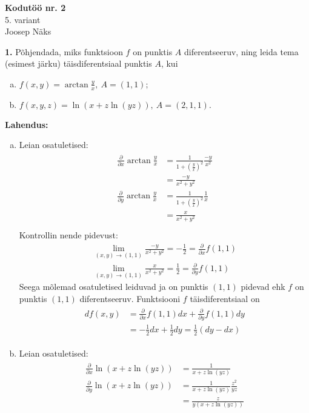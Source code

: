 \documentclass{article}
\newcommand{\p}[1]{\frac{\partial}{\partial #1}}
\begin{document}
\begin{center}
\Large\textbf{Kodutöö nr. 2}\\
5. variant\\
\small{Joosep Näks}
\end{center}
\textbf{1. } Põhjendada, miks funktsioon $f$ on punktis $A$ diferentseeruv, ning leida tema (esimest järku) täisdiferentsiaal punktis $A$, kui
\begin{enumerate}[(a)]
\item $f(x,y)=\arctan\frac{y}{x},\ A=(1,1);$
\item $f(x,y,z)=\ln(x+z\ln(yz)),\ A=(2,1,1).$
\end{enumerate}
\textbf{Lahendus:}
\begin{enumerate}[(a)]
\item Leian osatuletised:
\begin{gather*}
\begin{aligned}
\p{x}\arctan\frac{y}{x}&=\frac{1}{1+\left(\frac{y}{x}\right)^2}\frac{-y}{x^2}\\
&=\frac{-y}{x^2+y^2}\\
\p{y}\arctan\frac{y}{x}&=\frac{1}{1+\left(\frac{y}{x}\right)^2}\frac{1}{x}\\
&=\frac{x}{x^2+y^2}\\
\end{aligned}
\end{gather*}
Kontrollin nende pidevust:
\begin{gather*}
\lim_{(x,y)\to(1,1)}\frac{-y}{x^2+y^2}=-\frac{1}{2}=\p{x}f(1,1)\\
\lim_{(x,y)\to(1,1)}\frac{x}{x^2+y^2}=\frac{1}{2}=\p{y}f(1,1)
\end{gather*}
Seega mõlemad osatuletised leiduvad ja on punktis $(1,1)$ pidevad ehk $f$ on punktis $(1,1)$ diferentseeruv. Funktsiooni $f$ täisdiferentsiaal on 
\begin{gather*}
\begin{aligned}
df(x,y)&=\p{x}f(1,1)dx+\p{y}f(1,1)dy\\
&=-\frac{1}{2}dx+\frac{1}{2}dy=\frac{1}{2}(dy-dx)
\end{aligned}
\end{gather*}
\item Leian osatuletised:
\begin{gather*}
\begin{aligned}
\p{x}\ln(x+z\ln(yz))&=\frac{1}{x+z\ln(yz)}\\
\p{y}\ln(x+z\ln(yz))&=\frac{1}{x+z\ln(yz)}\frac{z^2}{yz}\\
&=\frac{z}{y(x+z\ln(yz))}\\

\end{aligned}
\end{gather*}
\end{enumerate}
\end{document}
